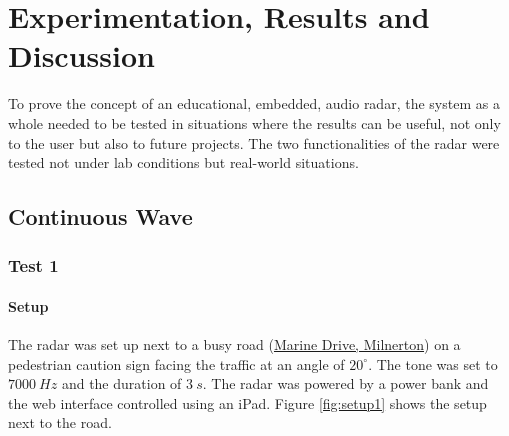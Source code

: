 \chapter{Experimentation, Results and\\ Discussion}\label{chap:Results}

To prove the concept of an educational, embedded, audio radar, the system as a whole needed to be tested in situations where the results can be useful, not only to the user but also to future projects. The two functionalities of the radar were tested not under lab conditions but real-world situations.

\section{Continuous Wave}
\subsection{Test 1}
\subsubsection{Setup}

The radar was set up next to a busy road (\href{https://www.google.com/maps/place/2A+Kei+Rd,+Milnerton,+Cape+Town,+7441/@-33.88786,18.4880057,18z/data=!3m1!4b1!4m13!1m7!3m6!1s0x1c3367685d1feaef:0x496954106fdbf460!2sR27!3b1!8m2!3d-33.860762!4d18.5008175!3m4!1s0x1dcc5c266817aa89:0xc42b15917dc67735!8m2!3d-33.88786!4d18.4891}{Marine Drive, Milnerton}) on a pedestrian caution sign facing the traffic at an angle of $20^\circ$. The tone was set to $7000\ Hz$ and the duration of $3\ s$. The radar was powered by a power bank and the web interface controlled using an iPad. Figure \ref{fig:setup1} shows the setup next to the road.


